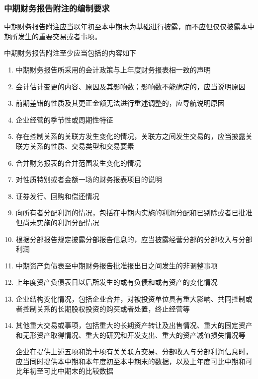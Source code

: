 \documentclass[UTF8,12pt]{ctexart}
\numberwithin{equation}{section} %
\numberwithin{figure}{section}
\numberwithin{table}{section}
\begin{document}
	\subsubsection{中期财务报告附注的编制要求}
	中期财务报告附注应当以年初至本中期末为基础进行披露，而不应但仅仅披露本中期所发生的重要交易或者事项。
	
	中期财务报告附注至少应当包括的内容如下
	\begin{enumerate}
		\item 中期财务报告所采用的会计政策与上年度财务报表相一致的声明
		
		\item 会计估计变更的内容、原因及其影响数；影响数不能确定的，应当说明原因
		
		\item 前期差错的性质及其更正金额无法进行重述调整的，应导航说明原因
		
		\item 企业经营的季节性或周期性特征
		
		\item 存在控制关系的关联方发生变化的情况，关联方之间发生交易的，应当披露关联方关系的性质、交易类型和交易要素
		
		\item 合并财务报表的合并范围发生变化的情况
		
		\item 对性质特别或者金额一场的财务报表项目的说明
		
		\item 证券发行、回购和偿还情况
		
		\item 向所有者分配利润的情况，包括在中期内实施的利润分配和已剔除或者已批准但尚未实施的利润分配情况
		
		\item 根据分部报告规定披露分部报告信息的，应当披露经营分部的分部收入与分部利润
		
		\item 中期资产负债表至中期财务报告批准报出日之间发生的非调整事项
		
		\item 上年度资产负债表日以后所发生的或有负债和或有资产的变化情况
		
		\item 企业结构变化情况，包括企业合并，对被投资单位具有重大影响、共同控制或者控制关系的长期股权投资的购买或者处置，终止经营等
		
		\item 其他重大交易或事项，包括重大的长期资产转让及出售情况、重大的固定资产和无形资产取得情况、重大的研究和开发支出、重大的资产减值损失情况等
		
		企业在提供上述五项和第十项有关关联方交易、分部收入与分部利润信息时，应当同时提供本中期和本年度初至本中期末的数据，以及上年度可比中期和可比年初至可比中期末的比较数据
	\end{enumerate}
	
\end{document}

